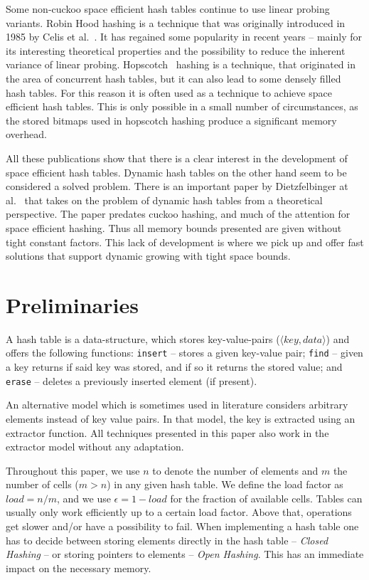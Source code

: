 \documentclass[a4paper,UKenglish]{lipics-v2016}
\begin{document}
Some non-cuckoo space efficient hash tables continue to use linear
probing variants.  Robin Hood hashing is a technique that was
originally introduced in 1985 by Celis et
al.~\cite{RobinHoodHashing}. It has regained some popularity in
recent years -- mainly for its interesting theoretical
properties and the possibility to reduce the inherent variance of
linear probing.  Hopscotch~\cite{HopscotchHashing} hashing is a
technique, that originated in the area of concurrent hash tables, but
it can also lead to some densely filled hash tables.  For this reason
it is often used as a technique to achieve space efficient hash
tables.  This is only possible in a small number of circumstances, as
the stored bitmaps used in hopscotch hashing produce a significant
memory overhead.

All these publications show that there is a clear interest in the
development of space efficient hash tables.  Dynamic hash tables on the
other hand seem to be considered a solved problem.  There is an
important paper by Dietzfelbinger at
al.~\cite{DynamicPerfectHashingUpperAndLowerBounds} that takes on the
problem of dynamic hash tables from a theoretical perspective.  The
paper predates cuckoo hashing, and much of the attention for space
efficient hashing. Thus all memory bounds presented are given without
tight constant factors.  This lack of development is where we pick up
and offer fast solutions that support dynamic growing with tight space
bounds.

\section{Preliminaries}
A hash table is a data-structure, which stores key-value-pairs
($\langle key, data \rangle$) and offers the following functions:
\verb~insert~ -- stores a given key-value pair; \verb~find~ -- given a
key returns if said key was stored, and if so it returns the stored
value; and \verb~erase~ -- deletes a previously inserted element (if
present).

An alternative model which is sometimes used in literature considers
arbitrary elements instead of key value pairs.  In that model, the key
is extracted using an extractor function.  All techniques presented in
this paper also work in the extractor model without any adaptation.

Throughout this paper, we use $n$ to denote the number of elements and
$m$ the number of cells ($m > n$) in any given hash table.  We define
the load factor as $load = n/m$, and we use $\epsilon = 1-load$ for
the fraction of available cells.  Tables can usually only work
efficiently up to a certain load factor.  Above that, operations get
slower and/or have a possibility to fail.  When implementing a hash
table one has to decide between storing elements directly in the hash
table -- \emph{Closed Hashing} -- or storing pointers to elements --
\emph{Open Hashing}. This has an immediate impact on the necessary
memory.
\end{document}
